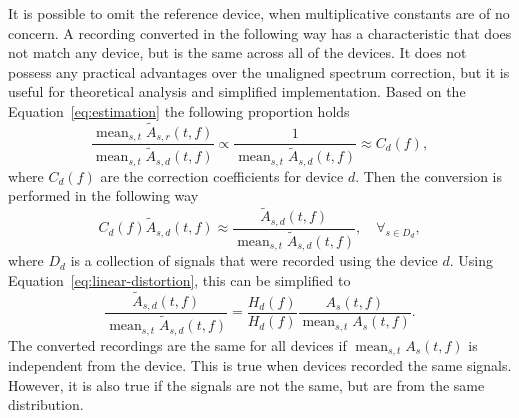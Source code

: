 \documentclass[a4paper]{article}
\newcommand{\va}{A}
\newcommand{\vh}{H}
\newcommand{\vc}{C}
\newcommand{\vD}{D}
\newcommand{\vs}{s}
\newcommand{\ff}{f}
\newcommand{\dr}{r}
\newcommand{\dd}{d}
\newcommand{\ampltf}[1]{\widetilde{\va}_{#1}\left(t,\ff\right)}
\newcommand{\respf}[1]{\vh_{#1}\left(\ff\right)}
\newcommand{\magntf}[2][]{\va_{#2}^{#1}\left(t,\ff\right)}
\newcommand{\coeff}[1]{\vc_{#1}\left(\ff\right)}
\DeclareMathOperator*{\mean}{mean}
\begin{document}
It is possible to omit the reference device, when multiplicative constants are of no concern. A recording converted in the following way has a characteristic that does not match any device, but is the same across all of the devices. It does not possess any practical advantages over the unaligned spectrum correction, but it is useful for theoretical analysis and simplified implementation.
Based on the Equation~\eqref{eq:estimation} the following proportion holds
\begin{equation}
    \frac{\mean_{\vs, t} \ampltf{\vs,\dr}}{\mean_{\vs, t} \ampltf{\vs,\dd}}
    \propto \frac{1}{\mean_{\vs, t} \ampltf{\vs,\dd}}
    \approx \coeff{\dd}
    ,
\end{equation}
where $\coeff{\dd}$ are the correction coefficients for device $\dd$.
Then the conversion is performed in the following way
\begin{equation}
    \coeff{\dd}\ampltf{\vs,\dd} \approx \frac{\ampltf{\vs,\dd}}{\mean_{\vs, t} \ampltf{\vs,\dd}}, \quad \forall_{\vs\in \vD_\dd},
\end{equation}
where $\vD_\dd$ is a collection of signals that were recorded using the device $\dd$. Using Equation~\eqref{eq:linear-distortion}, this can be simplified to
\begin{equation}
    \frac{\ampltf{\vs,\dd}}{\mean_{\vs, t} \ampltf{\vs,\dd}}
    = \frac{\respf{\dd}}{\respf{\dd}}\frac{\magntf{\vs}} {\mean_{\vs, t}\magntf{\vs}}.
\end{equation}
The converted recordings are the same for all devices if $\mean_{\vs, t}\magntf{\vs}$ is independent from the device. This is true when devices recorded the same signals. However, it is also true if the signals are not the same, but are from the same distribution.
\end{document}

